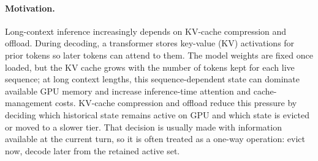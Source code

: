 \documentclass{article}
\begin{document}
\paragraph{Motivation.}
Long-context inference increasingly depends on KV-cache compression and
offload.
During decoding, a transformer stores key-value (KV) activations for prior
tokens so later tokens can attend to them.
The model weights are fixed once loaded, but the KV cache grows with the
number of tokens kept for each live sequence; at long context lengths, this
sequence-dependent state can dominate available GPU memory and increase
inference-time attention and cache-management costs.
KV-cache compression and offload reduce this pressure by deciding which
historical state remains active on GPU and which state is evicted or moved
to a slower tier.
That decision is usually made with information available at the current
turn, so it is often treated as a one-way operation: evict now, decode
later from the retained active set.
\end{document}

